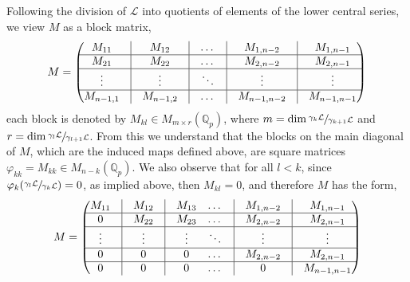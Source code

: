\documentclass[12pt]{article}
\begin{document}
Following the division of $\mathcal{L}$ into quotients of elements of the lower central series, we view $M$ as a block matrix, \[M=\begin{pmatrix}
M_{11} & \vline & M_{12}&\vline & \dots& \vline & M_{1,n-2} & \vline&M_{1,n-1}\\
\hline
M_{21} & \vline & M_{22}&\vline & \dots &\vline & M_{2,n-2} &\vline& M_{2,n-1}\\
\hline
\vdots & \vline & \vdots&\vline & \ddots &\vline & \vdots &\vline& \vdots\\
\hline
M_{n-1,1} & \vline & M_{n-1,2}&\vline & \dots &\vline & M_{n-1,n-2} &\vline& M_{n-1,n-1}\\
\end{pmatrix}\]
each block is denoted by $M_{kl}\in{M}_{m\times{r}}(\mathbb{Q}_p)$, where $m=\dim\sfrac{\gamma_k\mathcal{L}}{\gamma_{k+1}\mathcal{L}}$ and $r=\dim\sfrac{\gamma_l\mathcal{L}}{\gamma_{l+1}\mathcal{L}}$. From this we understand that the blocks on the main diagonal of $M$, which are the induced maps defined above, are square matrices $\varphi_{kk}=M_{kk}\in{M}_{n-k}(\mathbb{Q}_p)$. We also observe that for all $l<k$, since $\varphi_{k}(\sfrac{\gamma_{l}\mathcal{L}}{\gamma_k\mathcal{L}})=0$, as implied above, then $M_{kl}=0$, and therefore $M$ has the form, \[M=\begin{pmatrix}
M_{11} & \vline & M_{12}&\vline & M_{13} & \dots& \vline & M_{1,n-2} & \vline&M_{1,n-1}\\
\hline
0 & \vline & M_{22}&\vline & M_{23} & \dots &\vline & M_{2,n-2} &\vline& M_{2,n-1}\\
\hline
\vdots & \vline & \vdots&\vline & \vdots & \ddots &\vline & \vdots &\vline& \vdots\\
\hline
0 & \vline & 0&\vline & 0 & \dots &\vline & M_{2,n-2} &\vline& M_{2,n-1}\\
\hline
0 & \vline & 0 &\vline & 0 & \dots &\vline & 0 &\vline& M_{n-1,n-1}\\
\end{pmatrix}
\]
\end{document}
